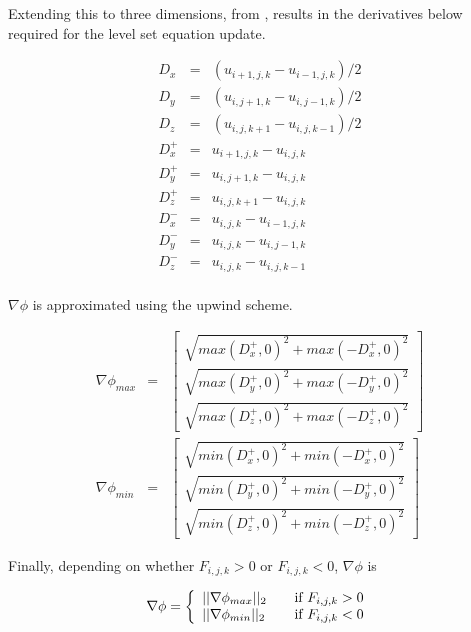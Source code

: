 Extending this to three dimensions, from \cite{Lefohn04astreaming}, results in the derivatives below required for the level set equation update. 

\begin{eqnarray}
	D_x &=& (u_{i+1,j,k}-u_{i-1,j,k})/2 \nonumber\\
	D_y &=& (u_{i,j+1,k}-u_{i,j-1,k})/2 \nonumber\\
	D_z &=& (u_{i,j,k+1}-u_{i,j,k-1})/2 \nonumber\\
	D_x^+ &=& u_{i+1,j,k}-u_{i,j,k} \nonumber\\
	D_y^+ &=& u_{i,j+1,k}-u_{i,j,k} \nonumber\\
	D_z^+ &=& u_{i,j,k+1}-u_{i,j,k} \nonumber\\
	D_x^- &=& u_{i,j,k}-u_{i-1,j,k} \nonumber\\
	D_y^- &=& u_{i,j,k}-u_{i,j-1,k} \nonumber\\
	D_z^- &=& u_{i,j,k}-u_{i,j,k-1} \nonumber\\
\end{eqnarray}

$\nabla\phi$ is approximated using the upwind scheme.

\begin{eqnarray}
\nabla\phi_{max} &=& \left[
  \begin{array}{ c }
     \sqrt{max(D_x^+, 0)^2 + max(-D_x^+,0)^2}  \\[2em]
     \sqrt{max(D_y^+, 0)^2 + max(-D_y^+,0)^2}  \\[2em]
     \sqrt{max(D_z^+, 0)^2 + max(-D_z^+,0)^2}  
  \end{array} \right] \\[2em]
\nabla\phi_{min} &=& \left[
  \begin{array}{ c }
     \sqrt{min(D_x^+, 0)^2 + min(-D_x^+,0)^2}  \\[2em]
     \sqrt{min(D_y^+, 0)^2 + min(-D_y^+,0)^2}  \\[2em]
     \sqrt{min(D_z^+, 0)^2 + min(-D_z^+,0)^2} 
  \end{array} \right] 
\end{eqnarray}

Finally, depending on whether $F_{i,j,k} > 0$ or $F_{i,j,k} < 0$, $\nabla\phi$ is 

\begin{equation}
\nabla\phi = \left\{ 
\begin{array}{l l}
  ||\nabla\phi_{max}||_2 & \quad \mbox{if $F_{i,j,k} > 0$}\\
  ||\nabla\phi_{min}||_2 & \quad \mbox{if $F_{i,j,k} < 0$}\\ \end{array} \right.
\label{eq:finalchoice}
\end{equation}

